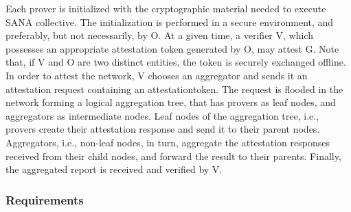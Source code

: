 \documentclass{article}
\begin{document}
Each prover is initialized with the cryptographic material needed to execute SANA collective. The initialization is performed in a secure environment, and preferably, but not necessarily, by O. At a given time, a verifier V, which possesses an appropriate attestation token generated by O, may attest G. Note that, if V and O are two distinct entities, the token is securely exchanged offline. In order to attest the network, V chooses an aggregator and sends it an attestation request containing an attestationtoken. The request is flooded in the network forming a logical aggregation tree, that has provers as leaf nodes, and aggregators as intermediate nodes. Leaf nodes of the aggregation tree, i.e., provers create their attestation response and send it to their parent nodes. Aggregators, i.e., non-leaf nodes, in turn, aggregate the attestation responses received from their child nodes, and forward the result to their parents. Finally, the aggregated report is received and verified by V.

\subsubsection{Requirements}
\end{document}
